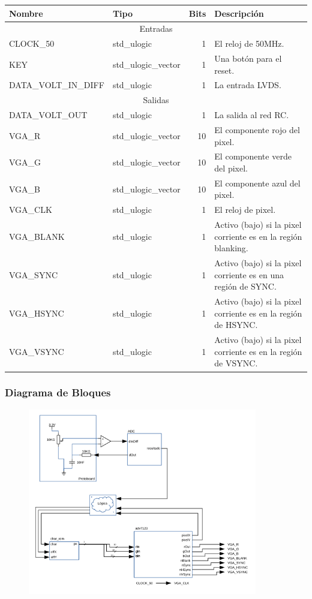 \documentclass[a4paper]{article}
\begin{document}
\begin{tabular}{| l | l | r | p{8cm} |}
\hline
\textbf{Nombre} & \textbf{Tipo} & \textbf{Bits} & \textbf{Descripción} \\ \hline
\multicolumn{4}{|c|}{Entradas} \\ \hline
CLOCK\_50 & std\_ulogic & 1 & El reloj de 50MHz. \\ 
KEY & std\_ulogic\_vector & 1 & Una botón para el reset. \\
DATA\_VOLT\_IN\_DIFF & std\_ulogic & 1 & La entrada LVDS. \\
\hline
\multicolumn{4}{|c|}{Salidas} \\ \hline
DATA\_VOLT\_OUT & std\_ulogic & 1 & La salida al red RC. \\
VGA\_R & std\_ulogic\_vector & 10 & El componente rojo del pixel. \\
VGA\_G & std\_ulogic\_vector & 10 & El componente verde del pixel. \\
VGA\_B & std\_ulogic\_vector & 10 & El componente azul del pixel. \\
VGA\_CLK & std\_ulogic & 1 & El reloj de pixel. \\
VGA\_BLANK & std\_ulogic & 1 & Activo (bajo) si la pixel corriente es en la región blanking. \\
VGA\_SYNC & std\_ulogic & 1 & Activo (bajo) si la pixel corriente es en una región de SYNC. \\
VGA\_HSYNC & std\_ulogic & 1 & Activo (bajo) si la pixel corriente es en la región de HSYNC. \\
VGA\_VSYNC & std\_ulogic & 1 & Activo (bajo) si la pixel corriente es en la región de VSYNC. \\
\hline
\end{tabular}

\subsubsection{Diagrama de Bloques}

\begin{figure}[!h]
\includegraphics[width=10cm]{img/tp2.png}
\end{figure}
\end{document}
